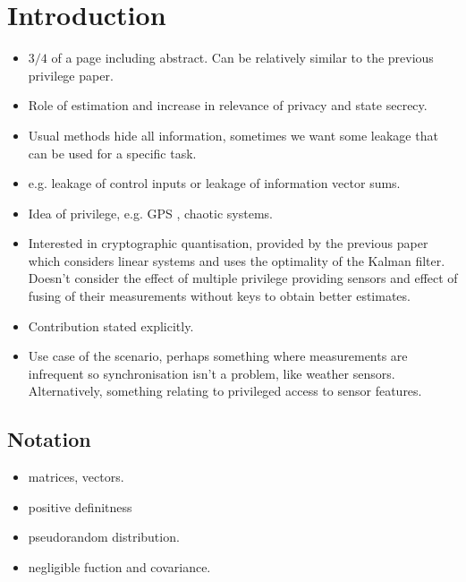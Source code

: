 \documentclass[conference]{IEEEtran}
\begin{document}
\section{Introduction}
\begin{itemize}
  \item $3/4$ of a page including abstract. Can be relatively similar to the previous privilege paper.
  \item Role of estimation and increase in relevance of privacy and state secrecy.
  \item Usual methods hide all information, sometimes we want some leakage that can be used for a specific task.
  \item e.g. leakage of control inputs or leakage of information vector sums.
  \item Idea of privilege, e.g. GPS \cite{grovesPrinciplesGNSSInertial2015}, chaotic systems.
  \item Interested in cryptographic quantisation, provided by the previous paper which considers linear systems and uses the optimality of the Kalman filter. Doesn't consider the effect of multiple privilege providing sensors and effect of fusing of their measurements without keys to obtain better estimates. 
  \item Contribution stated explicitly.
  \item Use case of the scenario, perhaps something where measurements are infrequent so synchronisation isn't a problem, like weather sensors. Alternatively, something relating to privileged access to sensor features.
\end{itemize}

\subsection{Notation}
\begin{itemize}
  \item matrices, vectors.
  \item positive definitness
  \item pseudorandom distribution.
  \item negligible fuction and covariance.
\end{itemize}
\end{document}
